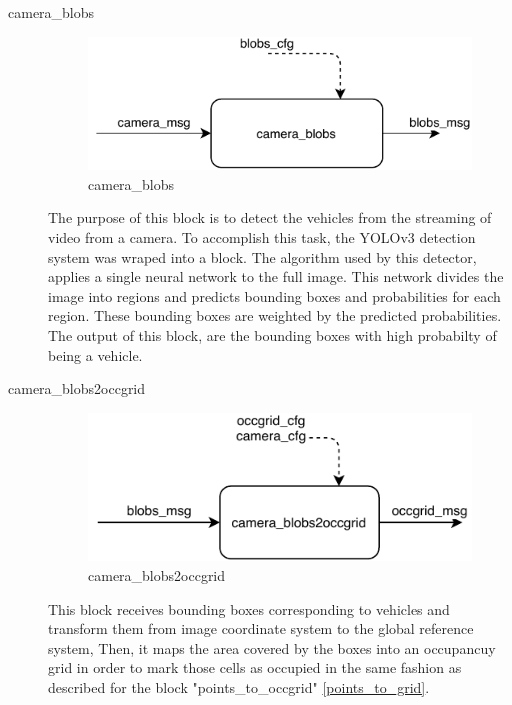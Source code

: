 \begin{description}
\item[camera\_blobs] \hfill

\begin{figure}[ht!]
\centering
\includegraphics[scale=1]{fig/3/camera_blobs.pdf}
\caption{camera\_blobs}
\label{camera_blobs}
\end{figure}

The purpose of this block is to detect the vehicles from the streaming of video from a camera. To accomplish this task, the YOLOv3 detection system \cite{yolov3} was wraped into a block. The algorithm used by this detector, applies a single neural network to the full image. This network divides the image into regions and predicts bounding boxes and probabilities for each region. These bounding boxes are weighted by the predicted probabilities. The output of this block, are the bounding boxes with high probabilty of being a vehicle.

\item[camera\_blobs2occgrid] \hfill

\begin{figure}[ht!]
\centering
\includegraphics[scale=1]{fig/3/camera_blobs2occgrid.pdf}
\caption{camera\_blobs2occgrid}
\label{camera_blobs2occgrid}
\end{figure}

This block receives bounding boxes corresponding to vehicles and transform them from image coordinate system to the global reference system, Then, it maps the area covered by the boxes into an occupancuy grid in order to mark those cells as occupied in the same fashion as described for the block "points\_to\_occgrid" \ref{points_to_grid}.

\end{description}

